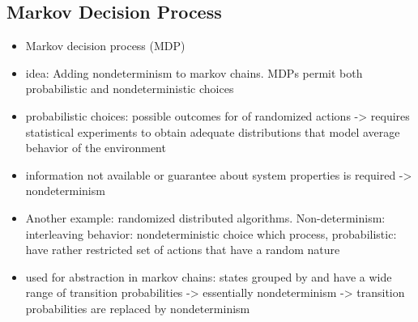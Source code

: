 \documentclass[preview]{standalone}
\begin{document}
	

\subsection{Markov Decision Process} 


\begin{itemize}
	\item Markov decision process (MDP) 
	\item idea: Adding nondeterminism to markov chains. MDPs permit both probabilistic and nondeterministic choices 
	\item probabilistic choices: possible outcomes for of randomized actions -> requires statistical experiments to obtain adequate distributions that model average behavior of the environment
	\item information not available or guarantee about system properties is required -> nondeterminism
	\item Another example: randomized distributed algorithms. Non-determinism: interleaving behavior: nondeterministic choice which process, probabilistic: have rather restricted set of actions that have a random nature
	\item used for abstraction in markov chains: states grouped by \atomicprops and have a wide range of transition probabilities -> essentially nondeterminism -> transition probabilities are replaced by nondeterminism		
\end{itemize}

\end{document}
